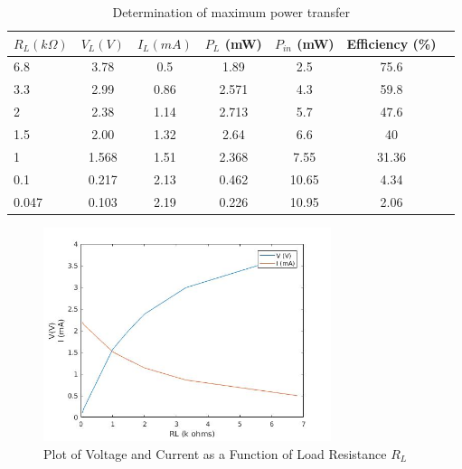 \documentclass{article}
\begin{document}
  
      \begin{table}[!ht]
  \captionsetup{font=large}
  \centering
  \caption{ Determination of maximum power transfer }
  \label{tab: maxpower }
  \begin{tabular}{   | l | c | c | c | c | c | r | }
  \hline

      $R_L(k \Omega)$ &     $V_L(V)$ &     $I_L(mA)$ &    $P_L$ (mW) &    $P_{in}$ (mW) &    Efficiency (\%)     \\ \hline
      6.8 &    3.78 &    0.5 &    1.89 &    2.5 &    75.6     \\ \hline
      3.3 &    2.99 &    0.86 &    2.571 &    4.3 &    59.8     \\ \hline
      2 &    2.38 &    1.14 &    2.713 &    5.7 &    47.6     \\ \hline
      1.5 &     2.00 &    1.32 &    2.64 &    6.6 &    40     \\ \hline
      1 &     1.568 &    1.51 &    2.368 &    7.55 &    31.36     \\ \hline
      0.1 &     0.217 &     2.13 &    0.462 &    10.65 &    4.34     \\ \hline
      0.047 &     0.103 &     2.19 &    0.226 &    10.95 &    2.06     \\ \hline
  
  \end{tabular}
  \end{table}



    \begin{figure}[!ht]
  \centering
  \caption{Plot of Voltage and Current as a Function of Load Resistance $R_L$\label{fig:resultCurrentvoltage}}
  \includegraphics[width=0.75\textwidth]{img/plotc.jpg}
  \end{figure}
\end{document}
